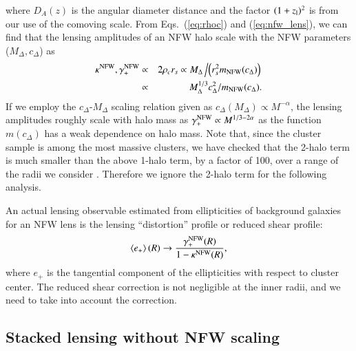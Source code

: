 \documentclass[iop, apj]{emulateapj}
\def\ave#1{\left\langle #1 \right\rangle}
\newcommand{\?}{\stackrel{?}{=}}
\begin{document}
%
where $D_A(z)$ is the angular diameter distance and the factor $(1+z_{\rm
l})^2$ is from our use of the comoving scale.  From Eqs.~(\ref{eq:rhoc})
and (\ref{eq:nfw_lens}), we can find that the lensing amplitudes of an
NFW halo scale with the NFW parameters ($M_\Delta, c_\Delta$) as
%
\begin{eqnarray}
 \kappa^{\rm NFW}, \gamma_+^{\rm NFW}&\propto& 2\rho_c r_s\propto
  M_{\Delta}\left/\left(r_s^2m_{\rm NFW}(c_\Delta)\right)\right.\nonumber\\
  &\propto& 
  M_\Delta^{1/3} c_{\Delta}^2/m_{\rm NFW}(c_\Delta).
  \label{eq:nfwlens_cM}
\end{eqnarray}
%
If we employ the $c_\Delta$-$M_\Delta$ scaling relation given as
$c_\Delta(M_\Delta)\propto M^{-\alpha}$, the lensing amplitudes roughly
scale with halo mass as $\gamma_+^{\rm NFW}\propto M^{1/3-2\alpha}$ as
the function $m(c_{\Delta })$ has a weak dependence on halo mass.  Note
that, since the cluster sample is among the most massive
clusters, we have checked that the 2-halo term is much smaller than the
above 1-halo term, by a factor of 100, over a range of the radii we
consider \citep[e.g., see][]{OguriTakada:11,TakadaSpergel:14}. Therefore we ignore the
2-halo term for the following analysis.

An actual lensing observable estimated from ellipticities of
background galaxies for an NFW lens is the lensing ``distortion'' profile
or reduced shear profile:
%
\begin{equation}
 \ave{e_+}(R)\rightarrow 
  \frac{\gamma_+^{\rm NFW}(R)}{1-\kappa^{\rm NFW}(R)},
\label{eq:reduced_shear}
\end{equation}
%
where $e_+$ is the tangential component of the ellipticities with
respect to cluster center. The reduced shear correction is not
negligible at the inner radii, and we need to take into account the
correction.


\subsection{Stacked lensing without NFW scaling}
\end{document}
